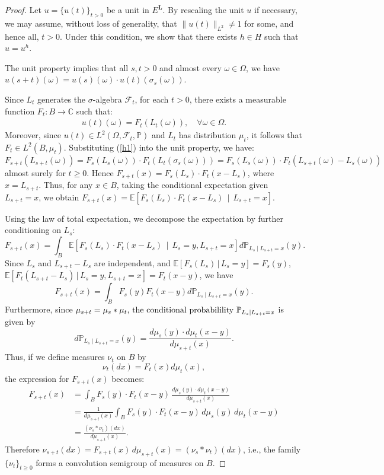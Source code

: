\documentclass[11pt]{amsart}
\theoremstyle{definition}
\theoremstyle{remark}
\numberwithin{equation}{section}
\begin{document}
\begin{proof}
Let \( u = \{u(t)\}_{t > 0} \) be a unit in \( E^{\bm{L}} \). By rescaling the unit \(u\) if necessary, we may assume, without loss of generality,  that \(\|u(t)\|_{L^2}\neq1\) for some, and hence all, \(t>0\). Under this condition, we show that there exists \(h\in H\) such that \(u=u^h\).

The unit property implies that  all \( s, t > 0 \) and almost every \( \omega \in \Omega \), we have \(
u(s + t)(\omega) = u(s)(\omega)\cdot u(t)(\sigma_s(\omega))
\). 

Since \( L_t \) generates the \(\sigma\)-algebra \( \mathcal{F}_t \), for each \( t > 0 \), there exists a measurable function \( F_t: B \to \mathbb{C} \) such that:
\begin{eqnarray}\label{h1}
u(t)(\omega) = F_t(L_t(\omega)), \quad \forall \omega \in \Omega.
\end{eqnarray}
Moreover, since \( u(t) \in L^2(\Omega, \mathcal{F}_t, \mathbb{P}) \) and \( L_t \) has distribution \( \mu_t \), it follows that \( F_t \in L^2(B, \mu_t) \). Substituting (\ref{h1}) into the unit property, we have:
\[
F_{s + t}(L_{s + t}(\omega)) = F_s(L_s(\omega)) \cdot F_t(L_{t}(\sigma_s(\omega)))= F_s(L_s(\omega)) \cdot F_t(L_{s+t}(\omega)-L_s(\omega))
\] almost surely for \(t\geq 0\). Hence \(F_{s+t}(x)=F_s(L_s)\cdot F_t(x-L_s)\), where $x=L_{s+t}$.  Thus, for any \( x \in B \), taking the conditional expectation given \(L_{s+t}=x\), we obtain  \(F_{s+t}(x)=\mathbb{E}[F_s(L_s)\cdot F_t(x-L_s)\,\mid\,L_{s+t}=x]\). 

Using the law of total expectation, we decompose the expectation by further conditioning on \(L_s\): \[F_{s+t}(x)=\int_B\mathbb{E}\left[F_s(L_s)\cdot F_t(x-L_s)\,\mid\,L_s=y, L_{s+t}=x \right]d\mathbb{P}_{L_s\mid L_{s+t}=x}(y).\]  Since $L_s$ and $L_{s+t}-L_s$ are independent, and \( \mathbb{E}\left[F_s(L_s)\,|\,L_s=y \right]=F_s(y)\), \(\mathbb{E}\left[F_t(L_{s+t}-L_s)\,|\,L_s=y, L_{s+t}=x \right]=F_t(x-y)\), we have  \[F_{s+t}(x)=\int_BF_s(y)F_t(x-y)d\mathbb{P}_{L_s\mid L_{s+t}=x}(y).\] Furthermore, since \(\mu_{s+t}=\mu_s\ast\mu_t$, the conditional probabilility \(\mathbb{P}_{L_s\mid L_{s+t}=x}\) is given by 
\[d\mathbb{P}_{L_s \mid L_{s + t} = x}(y) = \frac{d\mu_s(y) \cdot d\mu_t(x - y)}{d\mu_{s + t}(x)}.\] Thus, if we define measures $\nu_t$ on $B$ by \[\nu_t(dx)=F_t(x)d\mu_t(x),\] 
the expression for \( F_{s + t}(x) \) becomes:
\[
\begin{aligned}
F_{s + t}(x) &= \int_B F_s(y) \cdot F_t(x - y) \, \frac{d\mu_s(y) \cdot d\mu_t(x - y)}{d\mu_{s + t}(x)} \\
&= \frac{1}{d\mu_{s + t}(x)} \int_B F_s(y)\cdot F_t(x - y) \, d\mu_s(y)  \, d\mu_t(x - y) \\
&= \frac{(\nu_s * \nu_t)(dx)}{d\mu_{s + t}(x)}.
\end{aligned}
\]
Therefore \(
\nu_{s + t}(dx) = F_{s + t}(x) \, d\mu_{s + t}(x) = (\nu_s * \nu_t)(dx)
\), i.e., the family \( \{ \nu_t \}_{t\geq 0} \) forms a convolution semigroup of measures on \( B \).


\end{proof}
\end{document}
